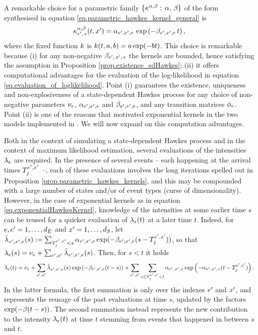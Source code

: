 \documentclass[10pt, article,table]{article}
\begin{document}
A remarkable choice for a parametric family $\lbrace \hawkesKernel^{\impCoef,\decCoef}: \, \impCoef, \, \decCoef\rbrace$ of the form synthesised in equation \eqref{eq.parametric_hawkes_kernel_general} is 
\begin{equation}\label{eq.exponentialHawkesKernel}
 \hawkesKernel^{\alpha,\beta}\subscriptee(t,\xone) = \impCoef_{\eone,\xone,e} \, \exp\left( -\decCoef_{\eone,\xone,e} \, t \right),
\end{equation}
where the fixed function $\parametricHawkesKernel$ is $\parametricHawkesKernel(t,a,b)=a\exp(-bt)$.
This choice is remarkable because (i) for any non-negative $\decCoef\subscriptexe$ the kernels are bounded, hence satisfying the assumption in Proposition \ref{prop.existence_sdHawkes}; (ii) it offers computational advantages for the evaluation of the log-likelihood in equation \eqref{eq.evaluation_of_loglikelihood}. 
Point (i) guarantees the existence, uniqueness and non-explosiveness of a state-dependent Hawkes process for any choice of non-negative parameters $\baseRate_e$, 
$\impCoef_{\eone,\xone, e}$ and $\decCoef_{\eone,\xone, e}$, and any transition matrices $\transProb_e$. Point (ii) is one of the reasons that motivated  exponential kernels in the two models implemented in \citealp{MP18sta}. We will now expand on this computation advantages. 

Both in the context of simulating a state-dependent Hawkes process and in the context of maximum likelihood estimation, several evaluations of the intensities $\intensity$ are required. 
In the presence of several events -- each happening at the arrival times $\arrivalTimes[\eone,\xone]_j$ --, each of these evaluations involves the long iterations spelled out in Proposition \ref{prop.parametric_hawkes_kernels}, and this may be compounded with a large number of states and/or of event types (curse of dimensionality). However, in the case of exponential kernels as in equation \eqref{eq.exponentialHawkesKernel}, knowledge of the intensities at some earlier time $s$ can be reused for a quicker evaluation of $\intensity(t)$ at a later time $t$. Indeed, for $e,\eone=1,\dots,\numEventTypes$ and $\xone=1,\dots,\numStates$, let $\tilde{\intensity[]}_{\eone,\xone,e}(s):= \sum_{\arrivalTimes[\eone,\xone]_j<s}\impCoef_{\eone,\xone,e}\exp(-\decCoef_{\eone,\xone,e}(s-\arrivalTimes[\eone,\xone]_j))$, so that $\intensity[e](s)=\baseRate_e+\sum_{\eone,\xone}\tilde{\intensity[]}_{\eone,\xone,e}(s)$. Then, for $s<t$ it holds
\begin{equation}\label{eq.update_of_exponential_intensity}
 \intensity[e](t) = \baseRate_e + \sum_{\eone,\xone}\tilde{\intensity[]}_{\eone,\xone,e}(s)\exp\left(-\decCoef_{\eone,\xone,e}(t-s)\right)
 + \sum_{\eone,\xone}\sum_{s\leq\arrivalTimes[\eone,\xone]_j<t} \impCoef\subscriptexe \exp\left(-\impCoef\subscriptexe(t-\arrivalTimes[\eone,\xone]_j)\right).
\end{equation}
In the latter formula, the first summation is only over the indexes $\eone$ and $\xone$, and represents the reusage of the past evaluations at time $s$, updated by the factors $\exp(-\decCoef (t-s))$. The second summation instead represents the new contribution to the intensity $\intensity[e](t)$ at time $t$ stemming from events that happened in between $s$ and $t$. 
\end{document}
